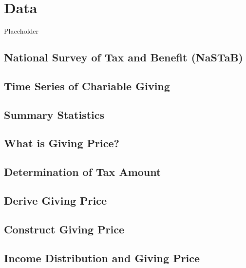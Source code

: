 \documentclass[ review  , 3p ]{elsarticle}
\begin{document}
  \hypertarget{data}{%
  \section{Data}\label{data}}
  
  Placeholder
  
  \hypertarget{national-survey-of-tax-and-benefit-nastab}{%
  \subsection{National Survey of Tax and Benefit (NaSTaB)}\label{national-survey-of-tax-and-benefit-nastab}}
  
  \hypertarget{time-series-of-chariable-giving}{%
  \subsection{Time Series of Chariable Giving}\label{time-series-of-chariable-giving}}
  
  \hypertarget{summary-statistics}{%
  \subsection{Summary Statistics}\label{summary-statistics}}
  
  \hypertarget{what-is-giving-price}{%
  \subsection{What is Giving Price?}\label{what-is-giving-price}}
  
  \hypertarget{determination-of-tax-amount}{%
  \subsection{Determination of Tax Amount}\label{determination-of-tax-amount}}
  
  \hypertarget{derive-giving-price}{%
  \subsection{Derive Giving Price}\label{derive-giving-price}}
  
  \hypertarget{construct-giving-price}{%
  \subsection{Construct Giving Price}\label{construct-giving-price}}
  
  \hypertarget{income-distribution-and-giving-price}{%
  \subsection{Income Distribution and Giving Price}\label{income-distribution-and-giving-price}}
  
\end{document}
